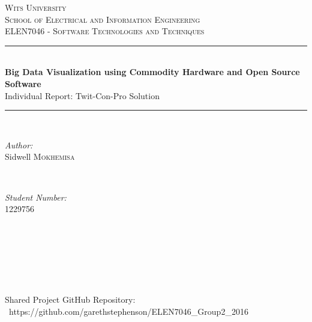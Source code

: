 \documentclass[12pt]{article} %
\begin{document}
	
	
	\begin{titlepage}
		
		\newcommand{\HRule}{\rule{\linewidth}{0.5mm}} %
		
		\center %
		
		\textsc{\LARGE Wits University}\\[1.5cm] %
		\textsc{\Large School of Electrical and Information Engineering}\\[0.5cm] %
		\textsc{\large ELEN7046 - Software Technologies and Techniques}\\[0.5cm] %
		
		\HRule \\[0.4cm]
		{ \huge \bfseries Big Data Visualization using Commodity Hardware and Open Source Software}\\[0.4cm] %
		
		Individual Report: Twit-Con-Pro Solution
		
		\HRule \\[0.6cm]
	
		\begin{minipage}
			{0.4
				\textwidth} 
			\begin{flushleft}
				\large \emph{Author:}\\
				Sidwell \textsc{Mokhemisa} \\
			\end{flushleft}
		\end{minipage}
		~ 
		\begin{minipage}
			{0.4
				\textwidth} 
			\begin{flushright}
				\large \emph{Student Number:} \\
				1229756 \\
			\end{flushright}
		\end{minipage}
		\\[1cm]
		
			\
			\\
			\
			\\
			\
			\\
			\
			\\
			\
			\\
			Shared Project GitHub Repository:\\
			\
			https://github.com/garethstephenson/ELEN7046\_Group2\_2016\\
			\
			\\
			\
			\\
			\
			\\
			\
			\\
			\
			\\
			\
			\\
			

\end{titlepage}
\end{document}
